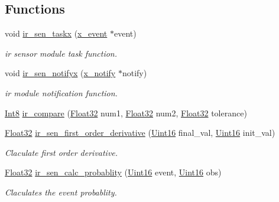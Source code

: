 \subsection*{Functions}
\begin{DoxyCompactItemize}
\item 
void \hyperlink{a00045_a24529100c87dfc257e9b56f7f0bcfa78}{ir\+\_\+sen\+\_\+taskx} (\hyperlink{a00036_de/d37/a00849}{x\+\_\+event} $\ast$event)
\begin{DoxyCompactList}\small\item\em ir sensor module task function. \end{DoxyCompactList}\item 
void \hyperlink{a00045_a36c6c2cdf9aa5844371e742330789dad}{ir\+\_\+sen\+\_\+notifyx} (\hyperlink{a00036_df/d4c/a00851}{x\+\_\+notify} $\ast$notify)
\begin{DoxyCompactList}\small\item\em ir module notification function. \end{DoxyCompactList}\item 
\hyperlink{a00072_a7e31ca7716b8d85dd473450a5c5e5a97}{Int8} \hyperlink{a00045_a8998900f530ecbf97f17089547a1c953}{ir\+\_\+compare} (\hyperlink{a00072_a87d38f886e617ced2698fc55afa07637}{Float32} num1, \hyperlink{a00072_a87d38f886e617ced2698fc55afa07637}{Float32} num2, \hyperlink{a00072_a87d38f886e617ced2698fc55afa07637}{Float32} tolerance)
\item 
\hyperlink{a00072_a87d38f886e617ced2698fc55afa07637}{Float32} \hyperlink{a00045_a1bff969fa2162ccb9701f6e88e8c912e}{ir\+\_\+sen\+\_\+first\+\_\+order\+\_\+derivative} (\hyperlink{a00072_a59a9f6be4562c327cbfb4f7e8e18f08b}{Uint16} final\+\_\+val, \hyperlink{a00072_a59a9f6be4562c327cbfb4f7e8e18f08b}{Uint16} init\+\_\+val)
\begin{DoxyCompactList}\small\item\em Claculate first order derivative. \end{DoxyCompactList}\item 
\hyperlink{a00072_a87d38f886e617ced2698fc55afa07637}{Float32} \hyperlink{a00045_a4a7227cd7b902e9a53daa10ddd05bbbf}{ir\+\_\+sen\+\_\+calc\+\_\+probablity} (\hyperlink{a00072_a59a9f6be4562c327cbfb4f7e8e18f08b}{Uint16} event, \hyperlink{a00072_a59a9f6be4562c327cbfb4f7e8e18f08b}{Uint16} obs)
\begin{DoxyCompactList}\small\item\em Claculates the event probablity. \end{DoxyCompactList}\item 

\end{DoxyCompactItemize}
